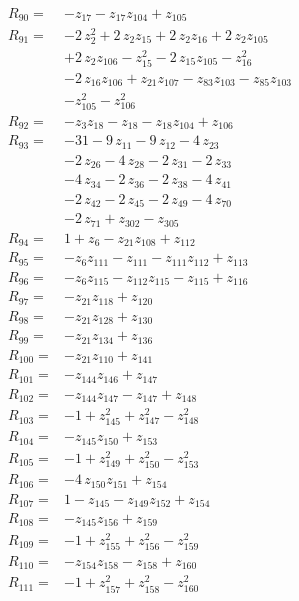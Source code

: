 \begin{align*}
R_{90}={}&-z_{17} -z_{17}z_{104} +z_{105}\\[2pt]
R_{91}={}&-2\,z_{2}^{2} +2\,z_{2}z_{15} +2\,z_{2}z_{16} +2\,z_{2}z_{105}\\
&+2\,z_{2}z_{106} -z_{15}^{2} -2\,z_{15}z_{105} -z_{16}^{2}\\
&-2\,z_{16}z_{106} +z_{21}z_{107} -z_{83}z_{103} -z_{85}z_{103}\\
&-z_{105}^{2} -z_{106}^{2}\\[2pt]
R_{92}={}&-z_{3}z_{18} -z_{18} -z_{18}z_{104} +z_{106}\\[2pt]
R_{93}={}&-31 -9\,z_{11} -9\,z_{12} -4\,z_{23}\\
&-2\,z_{26} -4\,z_{28} -2\,z_{31} -2\,z_{33}\\
&-4\,z_{34} -2\,z_{36} -2\,z_{38} -4\,z_{41}\\
&-2\,z_{42} -2\,z_{45} -2\,z_{49} -4\,z_{70}\\
&-2\,z_{71} +z_{302} -z_{305}\\[2pt]
R_{94}={}&1 +z_{6} -z_{21}z_{108} +z_{112}\\[2pt]
R_{95}={}&-z_{6}z_{111} -z_{111} -z_{111}z_{112} +z_{113}\\[2pt]
R_{96}={}&-z_{6}z_{115} -z_{112}z_{115} -z_{115} +z_{116}\\[2pt]
R_{97}={}&-z_{21}z_{118} +z_{120}\\[2pt]
R_{98}={}&-z_{21}z_{128} +z_{130}\\[2pt]
R_{99}={}&-z_{21}z_{134} +z_{136}\\[2pt]
R_{100}={}&-z_{21}z_{110} +z_{141}\\[2pt]
R_{101}={}&-z_{144}z_{146} +z_{147}\\[2pt]
R_{102}={}&-z_{144}z_{147} -z_{147} +z_{148}\\[2pt]
R_{103}={}&-1 +z_{145}^{2} +z_{147}^{2} -z_{148}^{2}\\[2pt]
R_{104}={}&-z_{145}z_{150} +z_{153}\\[2pt]
R_{105}={}&-1 +z_{149}^{2} +z_{150}^{2} -z_{153}^{2}\\[2pt]
R_{106}={}&-4\,z_{150}z_{151} +z_{154}\\[2pt]
R_{107}={}&1 -z_{145} -z_{149}z_{152} +z_{154}\\[2pt]
R_{108}={}&-z_{145}z_{156} +z_{159}\\[2pt]
R_{109}={}&-1 +z_{155}^{2} +z_{156}^{2} -z_{159}^{2}\\[2pt]
R_{110}={}&-z_{154}z_{158} -z_{158} +z_{160}\\[2pt]
R_{111}={}&-1 +z_{157}^{2} +z_{158}^{2} -z_{160}^{2}\\[2pt]

\end{align*}
